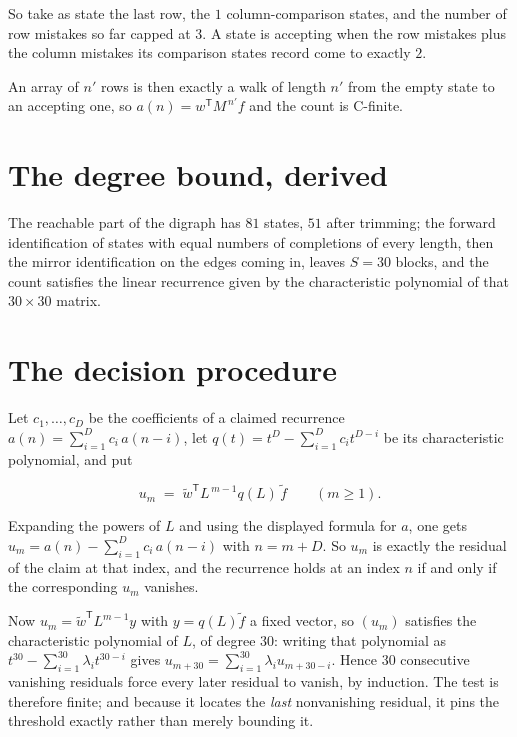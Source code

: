 \documentclass[11pt]{article}
\theoremstyle{definition}
\begin{document}
So take as state the last row, the $1$ column-comparison states, and the number of row mistakes so far capped at $3$. A state is accepting when the row mistakes plus the column mistakes its comparison states record come to exactly $2$.

An array of $n'$ rows is then exactly a walk of length $n'$ from the empty state to an accepting one, so $a(n) = w^{\mathsf T}M^{\,n'}f$ and the count is C-finite.

\section{The degree bound, derived}

The reachable part of the digraph has $81$ states, $51$ after trimming; the forward identification of states with equal numbers of completions of every length, then the mirror identification on the edges coming in, leaves $S = 30$ blocks, and the count satisfies the linear recurrence given by the characteristic polynomial of that $30\times30$ matrix.

\section{The decision procedure}

Let $c_1,\dots,c_D$ be the coefficients of a claimed recurrence $a(n) = \sum_{i=1}^{D} c_i\,a(n-i)$, let $q(t) = t^{D} - \sum_{i=1}^{D} c_i t^{D-i}$ be its characteristic polynomial, and put

\[u_m \;=\; \tilde w^{\mathsf T} L^{\,m-1} q(L)\,\tilde f \qquad (m \ge 1).\]

Expanding the powers of $L$ and using the displayed formula for $a$, one gets $u_m = a(n) - \sum_{i=1}^{D} c_i\,a(n-i)$ with $n = m + D$. So $u_m$ is exactly the residual of the claim at that index, and the recurrence holds at an index $n$ if and only if the corresponding $u_m$ vanishes.

Now $u_m = \tilde w^{\mathsf T} L^{m-1} y$ with $y = q(L)\tilde f$ a fixed vector, so $(u_m)$ satisfies the characteristic polynomial of $L$, of degree $30$: writing that polynomial as $t^{30} - \sum_{i=1}^{30} \lambda_i t^{30-i}$ gives $u_{m+30} = \sum_{i=1}^{30} \lambda_i u_{m+30-i}$. Hence $30$ consecutive vanishing residuals force every later residual to vanish, by induction. The test is therefore finite; and because it locates the {\itshape last} nonvanishing residual, it pins the threshold exactly rather than merely bounding it.
\end{document}

